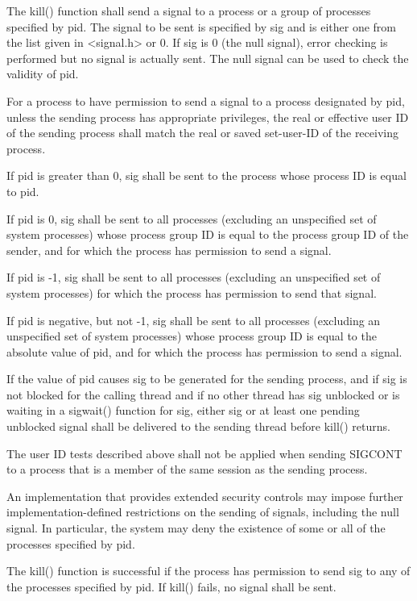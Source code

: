 \begin{DoxyVerb}The kill() function shall send a signal to a process or a group of
processes specified by pid. The signal to be sent is specified by sig
and is either one from the list given in <signal.h> or 0. If sig is 0
(the null signal), error checking is performed but no signal is actually
sent. The null signal can be used to check the validity of pid.

For a process to have permission to send a signal to a process designated
by pid, unless the sending process has appropriate privileges, the real
or effective user ID of the sending process shall match the real or
saved set-user-ID of the receiving process.

If pid is greater than 0, sig shall be sent to the process whose process
ID is equal to pid.

If pid is 0, sig shall be sent to all processes (excluding an unspecified
set of system processes) whose process group ID is equal to the process
group ID of the sender, and for which the process has permission to send
a signal.

If pid is -1, sig shall be sent to all processes (excluding an unspecified
set of system processes) for which the process has permission to send
that signal.

If pid is negative, but not -1, sig shall be sent to all processes
(excluding an unspecified set of system processes) whose process group
ID is equal to the absolute value of pid, and for which the process has
permission to send a signal.

If the value of pid causes sig to be generated for the sending process,
and if sig is not blocked for the calling thread and if no other thread
has sig unblocked or is waiting in a sigwait() function for sig, either
sig or at least one pending unblocked signal shall be delivered to the
sending thread before kill() returns.

The user ID tests described above shall not be applied when sending
SIGCONT to a process that is a member of the same session as the sending
process.

An implementation that provides extended security controls may impose
further implementation-defined restrictions on the sending of signals,
including the null signal. In particular, the system may deny the
existence of some or all of the processes specified by pid.

The kill() function is successful if the process has permission to send
sig to any of the processes specified by pid. If kill() fails, no signal
shall be sent.
\end{DoxyVerb}


